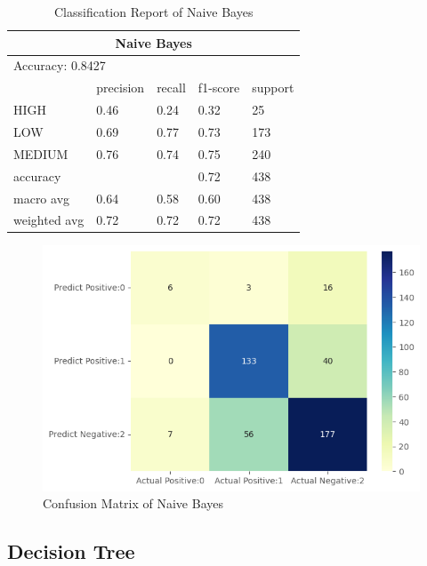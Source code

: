 \begin{table}[H]\centering
    \begin{tabular}{@{}lllll@{}}
    \toprule
    \multicolumn{5}{c}{Naive Bayes}                 \\ \midrule
    \multicolumn{5}{l}{Accuracy: 0.8427}       \\\midrule
                 & precision & recall & f1-score & support \\
    HIGH         & 0.46      & 0.24   & 0.32     & 25      \\ 
    LOW          & 0.69      & 0.77   & 0.73     & 173     \\
    MEDIUM       & 0.76      & 0.74   & 0.75     & 240     \\
    accuracy     &           &        & 0.72     & 438     \\
    macro avg    & 0.64      & 0.58   & 0.60     & 438     \\
    weighted avg & 0.72      & 0.72   & 0.72     & 438     \\ \bottomrule
    \end{tabular}
    \caption{Classification Report of Naive Bayes}
    \label{tablenb}
    \end{table}




\begin{figure}[H]
    \includegraphics[scale=0.7]{imgs/nb_cm.png}
    \centering
    \caption{Confusion Matrix of Naive Bayes}
    \label{cmnb}
\end{figure}

\subsection{Decision Tree} 

